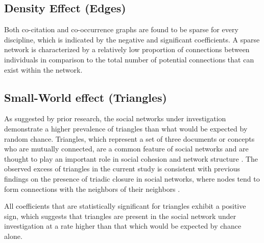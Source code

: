 


\subsection{Density Effect (Edges)}

Both co-citation and co-occurrence graphs are found to be sparse for every discipline, which is 
indicated by the negative and significant coefficients. A sparse network is characterized by a 
relatively low proportion of connections between individuals in comparison to the total number of 
potential connections that can exist within the network.

\subsection{Small-World effect (Triangles)}

As suggested by prior research, the social networks under investigation demonstrate a higher 
prevalence of triangles than what would be expected by random chance. Triangles, which represent a 
set of three documents or concepts who are mutually connected, are a common feature of social networks and are 
thought to play an important role in social cohesion and network structure 
\citep{kossinets2006, newman2018}. The observed excess of 
triangles in the current study is consistent with previous findings on the presence of triadic 
closure in social networks, where nodes tend to form connections with the neighbors of their 
neighbors \citep{burt2000}.

All coefficients that are statistically significant for triangles exhibit a positive sign, which 
suggests that triangles are present in the social network under investigation at a rate higher than 
that which would be expected by chance alone.

